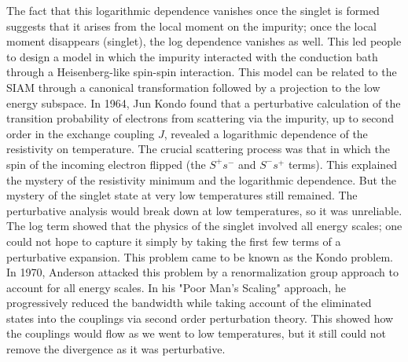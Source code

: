  The fact that this logarithmic dependence vanishes once the singlet is formed suggests that it arises from the local moment on the impurity; once the local moment disappears (singlet), the log dependence vanishes as well.
This led people to design a model in which the impurity interacted with the conduction bath through a Heisenberg-like spin-spin interaction.
This model can be related to the SIAM through a canonical transformation followed by a projection to the low energy subspace.
In 1964, Jun Kondo\cite{kondo1964resistance} found that a perturbative calculation of the transition probability of electrons from scattering via the impurity, up to second order in the exchange coupling \(J\), revealed a logarithmic dependence of the resistivity on temperature.
The crucial scattering process was that in which the spin of the incoming electron flipped (the \(S^+ s^-\) and \(S^- s^+\) terms).
This explained the mystery of the resistivity minimum and the logarithmic dependence.
But the mystery of the singlet state at very low temperatures still remained.
The perturbative analysis would break down at low temperatures, so it was unreliable.
The log term showed that the physics of the singlet involved all energy scales; one could not hope to capture it simply by taking the first few terms of a perturbative expansion.
This problem came to be known as the Kondo problem.
 In 1970, Anderson attacked this problem by a renormalization group approach to account for all energy scales.
In his "Poor Man's Scaling" approach, he progressively reduced the bandwidth while taking account of the eliminated states into the couplings via second order perturbation theory. This showed how the couplings would flow as we went to low temperatures, but it still could not remove the divergence as it was perturbative.


